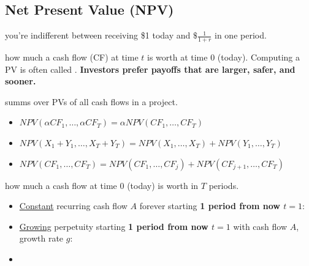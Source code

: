 \subsection{Net Present Value (NPV)}
 you're indifferent between receiving \$1 today and $\$\frac{1}{1+r}$ in one period.

 
how much a cash flow (CF) at time $t$ is worth at time 0 (today). Computing a PV is often called .
\textbf{Investors prefer payoffs that are \colorbox{PineGreen!30}{larger}, \colorbox{Blue!30}{safer}, and
\colorbox{BrickRed!30}{sooner}.}

  summs over PVs of all cash flows in a project.
\begin{itemize}
    \item {} $NPV(\alpha CF_1, \dots, \alpha CF_T) = \alpha NPV(CF_1, \dots, CF_T)$
    \item {} $NPV(X_1 + Y_1, \dots, X_T + Y_T) = NPV(X_1, \dots, X_T) + NPV(Y_1, \dots, Y_T)$
    \item {} $NPV(CF_1, \dots, CF_T) = NPV(CF_1, \dots, CF_j) + NPV(CF_{j+1}, \dots, CF_T)$
\end{itemize}

how much a cash flow at time 0 (today) is worth in $T$ periods.

\begin{itemize}
    \item \underline{Constant} recurring cash flow $A$ forever starting \textbf{1 period from now \ie $t = 1$}: 
    \item \underline{Growing} perpetuity starting \textbf{1 period from now \ie $t = 1$} with cash flow $A$, growth rate $g$: 
    \item {}
\end{itemize}

